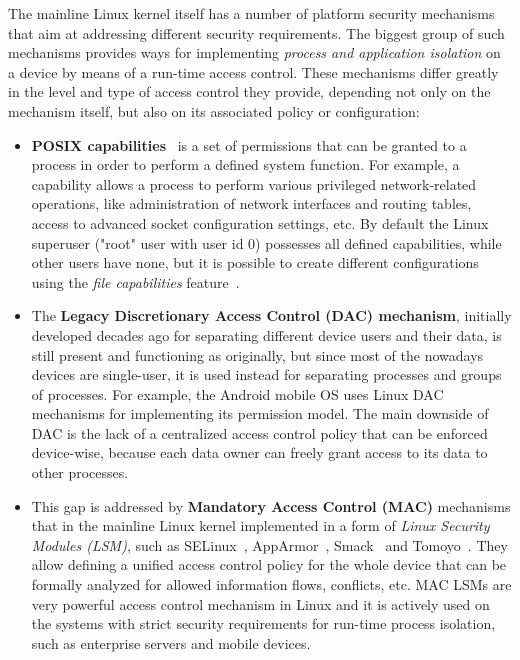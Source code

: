 The mainline Linux kernel itself has a number of platform security mechanisms that aim at addressing different security requirements. The biggest group of such mechanisms provides ways for implementing \textit{process and application isolation} on a device by means of a run-time access control. These mechanisms differ greatly in the level and type of access control they provide, depending not only on the mechanism itself, but also on its associated policy or configuration:

\begin{itemize}
	\item \textbf{POSIX capabilities}~\cite{caps} is a set of permissions that can be granted to a process in order to perform a defined system function. For example, a  capability allows a process to perform various privileged network-related operations, like administration of network interfaces and routing tables, access to advanced socket configuration settings, etc. By default the Linux superuser ("root" user with user id 0) possesses all defined capabilities, while other users have none, but it is possible to create different configurations using the \textit{file capabilities} feature~\cite{filecaps}. 
	\item The \textbf{Legacy Discretionary Access Control (DAC) mechanism}, initially developed decades ago for separating different device users and their data, is still present and functioning as originally, but since most of the nowadays devices are single-user, it is used instead for separating processes and groups of processes. For example, the Android mobile OS uses Linux DAC mechanisms for implementing its permission model. The main downside of DAC is the lack of a centralized access control policy that can be enforced device-wise, because each data owner can freely grant access to its data to other processes. 
	\item This gap is addressed by \textbf{Mandatory Access Control (MAC)} mechanisms that in the mainline Linux kernel implemented in a form of \textit{Linux Security Modules (LSM)}, such as SELinux~\cite{smalley2001implementing}, AppArmor~\cite{bauer2006paranoid}, Smack~\cite{bauer2006paranoid} and Tomoyo~\cite{tomoyo}. They allow defining a unified access control policy for the whole device that can be formally analyzed for allowed information flows, conflicts, etc. MAC LSMs are very powerful access control mechanism in Linux and it is actively used on the systems with strict security requirements for run-time process isolation, such as enterprise servers and mobile devices. 

\end{itemize}
